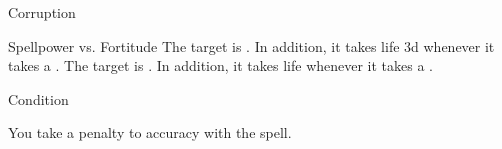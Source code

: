 \begin{spellsection}{Corruption}
\begin{spellheader}
\end{spellheader}
\begin{spellcontent}
\begin{spelltargetinginfo}
\end{spelltargetinginfo}
\begin{spelleffects}
\begin{spellattack}{Spellpower vs. Fortitude}
\spellsuccess
The target is .
In addition, it takes life  \minus3d whenever it takes a .
\spellcritical
The target is .
In addition, it takes life  whenever it takes a .
\end{spellattack}
\spelldur Condition
\end{spelleffects}
\end{spellcontent}
\begin{spellfooter}
\end{spellfooter}
\begin{spellsubcontent}
\begin{spellcantrip}
You take a  penalty to accuracy with the spell.
\end{spellcantrip}
\end{spellsubcontent}
\end{spellsection}
